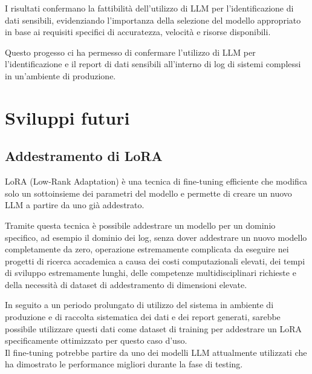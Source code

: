 \documentclass[12pt]{report}
\begin{document}
I risultati confermano la fattibilità dell'utilizzo di LLM per l'identificazione di dati sensibili, evidenziando l'importanza della selezione del modello appropriato in base ai requisiti specifici di accuratezza, velocità e risorse disponibili.



%
%



Questo progesso ci ha permesso di confermare l'utilizzo di LLM per l'identificazione e il report di dati sensibili all'interno di log di sistemi complessi in un'ambiente di produzione.

\section{Sviluppi futuri}
\label{sec:sviluppi_futuri}

\subsection{Addestramento di LoRA}
\label{subsec:addestramento_lora}

LoRA (Low-Rank Adaptation) è una tecnica di fine-tuning efficiente che modifica solo un sottoinsieme dei parametri del modello e permette di creare un nuovo LLM a partire da uno già addestrato.

Tramite questa tecnica è possibile addestrare un modello per un dominio specifico, ad esempio il dominio dei log, senza dover addestrare un nuovo modello completamente da zero, operazione estremamente complicata da eseguire nei progetti di ricerca accademica a causa dei costi computazionali elevati, dei tempi di sviluppo estremamente lunghi, delle competenze multidisciplinari richieste e della necessità di dataset di addestramento di dimensioni elevate.

In seguito a un periodo prolungato di utilizzo del sistema in ambiente di produzione e di raccolta sistematica dei dati e dei report generati, sarebbe possibile utilizzare questi dati come dataset di training per addestrare un LoRA specificamente ottimizzato per questo caso d'uso. \\
Il fine-tuning potrebbe partire da uno dei modelli LLM attualmente utilizzati che ha dimostrato le performance migliori durante la fase di testing.
\end{document}
